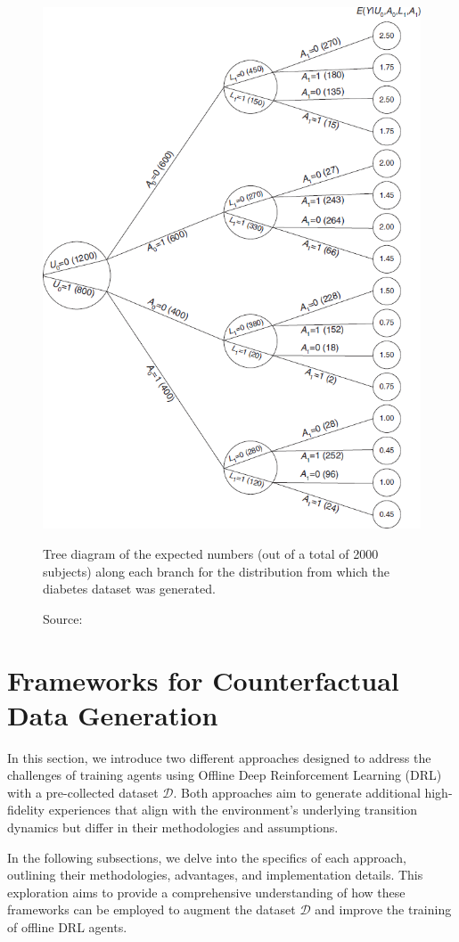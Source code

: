 \begin{figure}[h]
    \centering
    \includegraphics[width=.65\textwidth]{figures/ch4/diabetes1.png}
    \caption{Tree diagram of the expected numbers
    (out of a total of 2000 subjects) along each
    branch for the distribution from which the diabetes
    dataset was generated.}
    \vspace{-10px}
    \caption*{\scriptsize{Source: \cite{sim2012}}}
    \label{fig:diabetes1}
\end{figure}

\section{Frameworks for Counterfactual Data Generation}

In this section, we introduce two different approaches designed to
address the challenges of training agents using Offline
Deep Reinforcement Learning (DRL) with a pre-collected dataset \( \mathcal{D} \).
Both approaches aim to generate additional high-fidelity experiences
that align with the environment's underlying transition dynamics
but differ in their methodologies and assumptions.

In the following subsections, we delve into the specifics
of each approach, outlining their methodologies, advantages, and
implementation details. This exploration aims to
provide a comprehensive understanding of how these
frameworks can be employed to augment the dataset \( \mathcal{D} \) and improve
the training of offline DRL agents.


